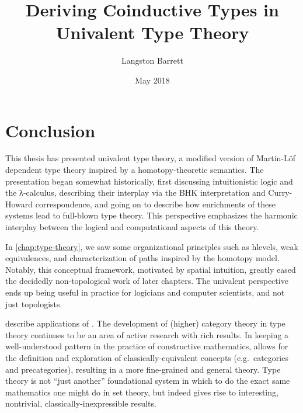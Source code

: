 \documentclass[12pt,twoside]{reedthesis}
\title{Deriving Coinductive Types in Univalent Type Theory}
\author{Langston Barrett}
\date{May 2018}
\begin{document}
\maketitle
\frontmatter %
\pagestyle{empty} %








\chapter*{Conclusion}
\setcounter{chapter}{5}
\setcounter{section}{0}

This thesis has presented univalent type theory, a modified version of Martin-Löf
dependent type theory inspired by a homotopy-theoretic semantics. The
presentation began somewhat historically, first discussing intuitionistic
logic and the λ-calculus, describing their interplay via the BHK interpretation
and Curry-Howard correspondence, and going on to describe how enrichments of
these systems lead to full-blown type theory. This perspective emphasizes
the harmonic interplay between the logical and computational aspects of this
theory. 

In \cref{chap:type-theory}, we saw some organizational principles such as
hlevels, weak equivalences, and characterization of paths inspired by the
homotopy model. Notably, this conceptual framework, motivated by spatial
intuition, greatly eased the decidedly non-topological work of later chapters. 
The univalent perspective ends up being useful in practice for logicians and
computer scientists, and not just topologists.

describe applications of \UTT{}. The development of (higher) category theory in
type theory continues to be an area of active research with rich results.
In keeping a well-understood pattern in the practice of constructive mathematics,
\UTT{} allows for the definition and exploration of classically-equivalent
concepts (e.g.\ categories and precategories), resulting in a more fine-grained
and general theory. Type theory is not ``just another'' foundational system in
which to do the exact same mathematics one might do in set theory, but indeed
gives rise to interesting, nontrivial, classically-inexpressible results.
\end{document}
